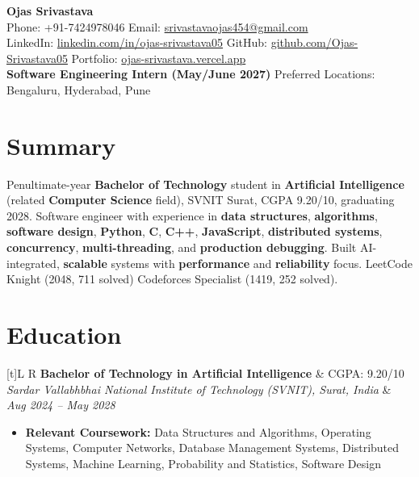 \documentclass[a4paper,10pt]{article}
\newcommand{\resumeSubheading}[4]{
  \vspace{1mm}
  \noindent
  \begin{tabularx}{\textwidth}[t]{L R}
    \textbf{#1} & #4 \\
    \textit{#3} & \textit{#2} \\
  \end{tabularx}
  \vspace{-1mm}
}
\begin{document}
\selectfont

\begin{center}
  {\LARGE \textbf{Ojas Srivastava}} \\[1mm]
  \small
  Phone: +91-7424978046 \textbar{}
  Email: \href{mailto:srivastavaojas454@gmail.com}{srivastavaojas454@gmail.com} \\[0.5mm]
  LinkedIn: \href{https://linkedin.com/in/ojas-srivastava05}{linkedin.com/in/ojas-srivastava05} \textbar{}
  GitHub: \href{https://github.com/Ojas-Srivastava05}{github.com/Ojas-Srivastava05} \textbar{}
  Portfolio: \href{https://ojas-srivastava.vercel.app}{ojas-srivastava.vercel.app} \\[0.5mm]
  \textbf{Software Engineering Intern (May/June 2027)} \textbar{}
  Preferred Locations: Bengaluru, Hyderabad, Pune
\end{center}

\vspace{-1mm}

\section{Summary}
\small
Penultimate-year \textbf{Bachelor of Technology} student in \textbf{Artificial Intelligence} (related \textbf{Computer Science} field), SVNIT Surat, CGPA 9.20/10, graduating 2028. Software engineer with experience in \textbf{data structures}, \textbf{algorithms}, \textbf{software design}, \textbf{Python}, \textbf{C}, \textbf{C++}, \textbf{JavaScript}, \textbf{distributed systems}, \textbf{concurrency}, \textbf{multi-threading}, and \textbf{production debugging}. Built AI-integrated, \textbf{scalable} systems with \textbf{performance} and \textbf{reliability} focus. LeetCode Knight (2048, 711 solved) \textbar{} Codeforces Specialist (1419, 252 solved).

\section{Education}
\small
\resumeSubheading
  {Bachelor of Technology in Artificial Intelligence}{Aug 2024 -- May 2028}
  {Sardar Vallabhbhai National Institute of Technology (SVNIT), Surat, India}{CGPA: 9.20/10}
\begin{itemize}
  \item \textbf{Relevant Coursework:} Data Structures and Algorithms, Operating Systems, Computer Networks, Database Management Systems, Distributed Systems, Machine Learning, Probability and Statistics, Software Design
\end{itemize}
\end{document}
